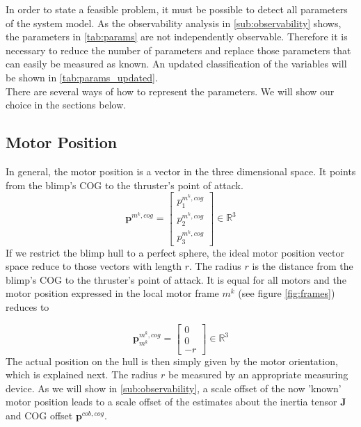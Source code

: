 In order to state a feasible problem, it must be possible to detect all parameters of the system model.
As the observability analysis in \cref{sub:observability} shows, the parameters in \cref{tab:params} are not independently observable.
Therefore it is necessary to reduce the number of parameters and replace those parameters that can easily be measured as known.
An updated classification of the variables will be shown in \cref{tab:params_updated}.
\\

There are several ways of how to represent the parameters.
We will show our choice in the sections below.

\subsection{Motor Position}
\label{sub:par_position}
In general, the motor position is a vector in the three dimensional space.
It points from the blimp's COG to the thruster's point of attack.
\begin{equation*}
\mathbf{p}^{m^k,cog}
=
\left[ \begin{array}{c}
p^{m^k,cog}_1 \\
p^{m^k,cog}_2 \\
p^{m^k,cog}_3
\end{array} \right]
\in \mathbb{R}^3
\end{equation*}
If we restrict the blimp hull to a perfect sphere, the ideal motor position vector space reduce to those vectors with length $r$.
The radius $r$ is the distance from the blimp's COG to the thruster's point of attack.
It is equal for all motors and the motor position expressed in the local motor frame $m^k$ (see figure \ref{fig:frames}) reduces to

\begin{equation}
\label{eq:motor_position}
\mathbf{p}^{m^k,cog}_{m^k}
=
\left[ \begin{array}{c}
0 \\
0 \\
-r
\end{array} \right]
\in \mathbb{R}^3
\end{equation}
The actual position on the hull is then simply given by the motor orientation, which is explained next.
The radius $r$ be measured by an appropriate measuring device.
As we will show in \cref{sub:observability}, a scale offset of the now 'known' motor position leads to a scale offset of the estimates about the inertia tensor $\mathbf{J}$ and COG offset $\mathbf{p}^{cob,cog}$.

